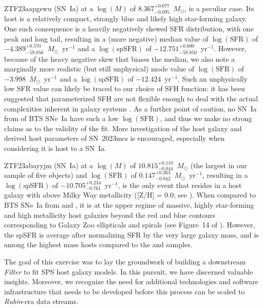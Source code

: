 \documentclass[twocolumn]{aastex63}
\begin{document}
ZTF23aapgswu (SN~Ia) at a $\log(M)$ of $8.367^{+0.077}_{-0.095}$~$M_{\odot}$, is a peculiar case. Its host is a relatively compact, strongly blue and likely high star-forming galaxy. One such consequence is a heavily negatively skewed SFR distribution, with one peak and long tail, resulting in a (more negative) median value of $\log(\text{SFR})$ of $-4.389^{+0.570}_{-59.850}$~$M_{\odot}$~yr$^{-1}$ and a $\log(\text{spSFR})$ of $-12.751^{+0.600}_{-59.850}$~yr$^{-1}$. However, because of the heavy negative skew that biases the median, we also note a marginally more realistic (but still unphysical) mode value of $\log(\text{SFR})$ of $-3.998$~$M_{\odot}$~yr$^{-1}$ and a $\log(\text{spSFR})$ of $-12.424$~yr$^{-1}$. Such an unphysically low SFR value can likely be traced to our choice of SFH function: it has been suggested that parameterized SFH are not flexible enough to deal with the actual complexities inherent in galaxy systems \citep{Leja_2019_nonparametricSFH}. As a further point of caution, no SN~Ia from \cite{Irani2022} of BTS SNe~Ia have such a low $\log(\text{SFR})$, and thus we make no strong claims as to the validity of the fit. More investigation of the host galaxy and derived host parameters of SN~2023mcs is encouraged, especially when considering it is host to a SN~Ia. \par

ZTF23abayyjm (SN~Ia) at a $\log(M)$ of $10.815^{+0.110}_{-0.044}$~$M_{\odot}$ (the largest in our sample of five objects) and $\log(\text{SFR})$ of $0.147^{+0.263}_{-0.842}$~$M_{\odot}$~yr$^{-1}$, resulting in a $\log(\text{spSFR})$ of $-10.705^{+0.234}_{-0.761}$~yr$^{-1}$, is the only event that resides in a host galaxy with above Milky Way metallicity ([Z/H] = 0.0; see \citet{Choi_2016_MIST}). When compared to BTS SNe~Ia from \cite{Irani2022} and \cite{Sharma2023}, it is at the upper regime of massive, highly star-forming and high metallicity host galaxies beyond the red and blue contours corresponding to Galaxy Zoo ellipticals and spirals (see Figure~14 of \citet{Irani2022}). However, the spSFR is average after normalizing SFR by the very large galaxy mass, and is among the highest mass hosts compared to the \cite{Irani2022} and \cite{Sharma2023} samples. \par

The goal of this exercise was to lay the groundwork of building a downstream \emph{Filter} to fit SPS host galaxy models. In this pursuit, we have discerned valuable insights. Moreover, we recognize the need for additional technologies and software infrastructure that needs to be developed before this process can be scaled to \emph{Rubin}-era data streams. \par
\end{document}
